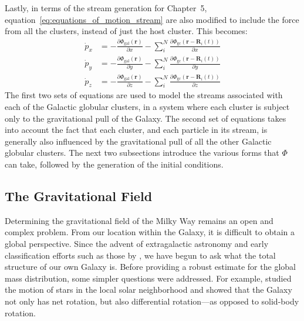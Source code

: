         Lastly, in terms of the stream generation for Chapter~5, equation~\ref{eq:equations_of_motion_stream} are also modified to include the force from all the clusters, instead of just the host cluster. This becomes: 
        \begin{equation}
            \begin{aligned}
                \dot{p}_{x} &= -\frac{\partial \Phi_\mathrm{gal}\left(\mathbf{r}\right)}{\partial x} - \sum_i^N \frac{\partial \Phi_\mathrm{gc}\left(\mathbf{r} - \mathbf{R}_i(t)\right)}{\partial x}\\
                \dot{p}_{y} &= -\frac{\partial \Phi_\mathrm{gal}\left(\mathbf{r}\right)}{\partial y} - \sum_i^N \frac{\partial \Phi_\mathrm{gc}\left(\mathbf{r} - \mathbf{R}_i(t)\right)}{\partial y}\\
                \dot{p}_{z} &= -\frac{\partial \Phi_\mathrm{gal}\left(\mathbf{r}\right)}{\partial z} - \sum_i^N \frac{\partial \Phi_\mathrm{gc}\left(\mathbf{r} - \mathbf{R}_i(t)\right)}{\partial z}
            \end{aligned}
        \end{equation}
        The first two sets of equations are used to model the streams associated with each of the Galactic globular clusters, in a system where each cluster is subject only to the gravitational pull of the Galaxy. The second set of equations takes into account the fact that each cluster, and each particle in its stream, is generally also influenced by the gravitational pull of all the other Galactic globular clusters. The next two subsections introduce the various forms that $\Phi$ can take, followed by the generation of the initial conditions. 

    \subsection{The Gravitational Field} \label{subsec:gravfield}
        Determining the gravitational field of the Milky Way remains an open and complex problem. From our location within the Galaxy, it is difficult to obtain a global perspective. Since the advent of extragalactic astronomy and early classification efforts such as those by \citet{1926ApJ....64..321H}, we have begun to ask what the total structure of our own Galaxy is. Before providing a robust estimate for the global mass distribution, some simpler questions were addressed. For example, \citet{1927BAN.....4...91O} studied the motion of stars in the local solar neighborhood and showed that the Galaxy not only has net rotation, but also differential rotation—as opposed to solid-body rotation.

